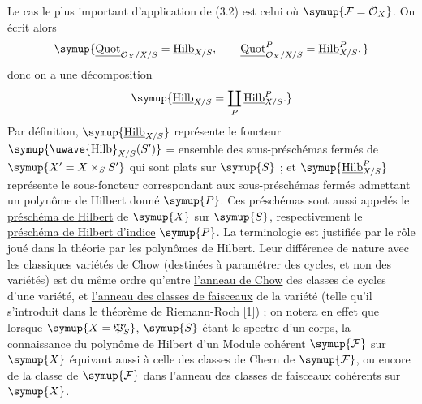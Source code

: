 Le cas le plus important d'application de (3.2) est celui où
$\symup{\mathcal F=\mathcal O_X}$. On écrit alors
\[
\symup{\underline{\operatorname{Quot}}_{\mathcal O_X/X/S}=\underline{\operatorname{Hilb}}_{X/S},
\qquad
\underline{\operatorname{Quot}}^P_{\mathcal O_X/X/S}=\underline{\operatorname{Hilb}}^P_{X/S},}
\]
donc on a une décomposition
\[
\symup{\underline{\operatorname{Hilb}}_{X/S}=\coprod_P\underline{\operatorname{Hilb}}^P_{X/S}.}
\]
Par définition, $\symup{\underline{\operatorname{Hilb}}_{X/S}}$ représente le foncteur
$\symup{\mathop{\text{\uwave{Hilb}}}\nolimits_{X/S}(S')}$ = ensemble des sous-préschémas
fermés de $\symup{X'=X\times_SS'}$ qui sont plats sur $\symup{S}$ ; et
$\symup{\underline{\operatorname{Hilb}}^P_{X/S}}$ représente le sous-foncteur correspondant aux
sous-préschémas fermés admettant un polynôme de Hilbert donné $\symup{P}$. Ces
préschémas sont aussi appelés le \uline{préschéma de Hilbert} de $\symup{X}$ sur $\symup{S}$,
respectivement le \uline{préschéma de Hilbert d'indice} $\symup{P}$. La terminologie est
justifiée par le rôle joué dans la théorie par les polynômes de Hilbert. Leur
différence de nature avec les classiques variétés de Chow (destinées à
paramétrer des cycles, et non des variétés) est du même ordre qu'entre
\uline{l'anneau de Chow} des classes de cycles d'une variété, et \uline{l'anneau des classes de faisceaux} de la variété (telle qu'il s'introduit dans le théorème de
Riemann-Roch [1]) ; on notera en effet que lorsque $\symup{X=\mathfrak P^r_S}$, $\symup{S}$
étant le spectre d'un corps, la connaissance du polynôme de Hilbert d'un Module
cohérent $\symup{\mathcal F}$ sur $\symup{X}$ équivaut aussi à celle des classes de Chern de
$\symup{\mathcal F}$, ou encore de la classe de $\symup{\mathcal F}$ dans l'anneau des classes
de faisceaux cohérents sur $\symup{X}$.

